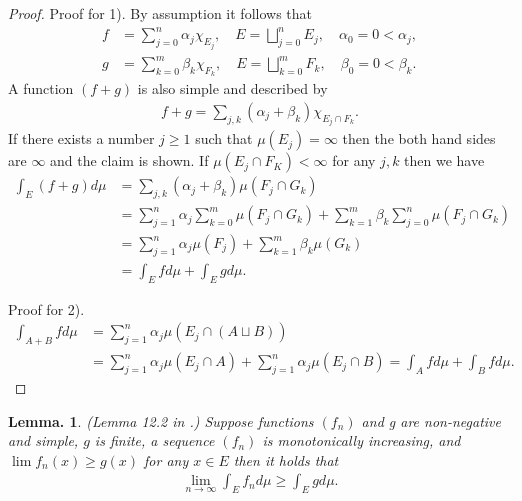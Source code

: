 \documentclass[openany, a4paper, oneside]{jsbook}
\theoremstyle{break}
\newtheorem{lem}[thm]{Lemma.}
\theoremstyle{breakdefn}
\newcommand{\rbk}[1]{\left (#1\right)}
\begin{document}
\begin{proof}
Proof for 1).
By assumption it follows that
\begin{align}
  f
  &=
  \sum_{j=0}^n \alpha_j \chi_{E_j}, \quad
  E
  =
  \bigsqcup_{j=0}^{n} E_j, \quad
  \alpha_0 = 0 < \alpha_j, \\
  g
  &=
  \sum_{k=0}^m \beta_k \chi_{F_k}, \quad
  E
  =
  \bigsqcup_{k=0}^{m} F_k, \quad
  \beta_0 = 0 < \beta_k.
\end{align}
A function $(f+g)$ is also simple and described by
\begin{align}
  f + g
  =
  \sum_{j,k} (\alpha_j + \beta_k) \chi_{E_j \cap F_k}.
\end{align}
If there exists a number $j \geq 1$ such that $\mu (E_j) = \infty$ then
the both hand sides are $\infty$ and the claim is shown.
If $\mu (E_j \cap F_K) < \infty$ for any $j,k$ then we have
\begin{align}
 \int_E (f+g) d\mu
 &=
 \sum_{j,k} \rbk{\alpha_j + \beta_k} \mu (F_j \cap G_k) \\
 &=
 \sum_{j=1}^n \alpha_j \sum_{k=0}^m \mu (F_j \cap G_k) + \sum_{k=1}^m \beta_k \sum_{j=0}^n \mu (F_j \cap G_k) \\
 &=
 \sum_{j=1}^n \alpha_j \mu (F_j) + \sum_{k=1}^m \beta_k \mu (G_k) \\
 &=
 \int_E f d\mu + \int_E g d\mu.
\end{align}

Proof for 2).
\begin{align}
 \int_{A+B} f d \mu
 &=
 \sum_{j=1}^n \alpha_j \mu \rbk{E_j \cap \rbk{A \sqcup B}} \\
 &=
 \sum_{j=1}^n \alpha_j \mu \rbk{E_j \cap A} + \sum_{j=1}^n \alpha_j \mu \rbk{E_j \cap B}
 =
 \int_A f d\mu + \int_B f d\mu.
\end{align}
\end{proof}
\begin{lem}\textup{(Lemma 12.2 in \cite{SeizoIto1}.)}
 Suppose functions $(f_n)$ and g are non-negative and simple, $g$ is finite, a sequence $(f_n)$ is monotonically increasing, and
 $\lim f_n (x) \geq g (x)$ for any $x \in E$ then it holds that
 \begin{align}
  \lim_{n \to \infty} \int_E f_n d \mu
  \geq
  \int_E g d\mu.
 \end{align}
\end{lem}
\end{document}
